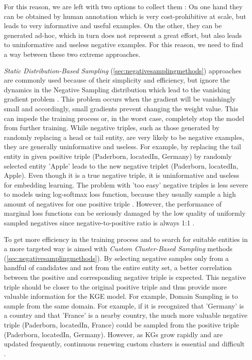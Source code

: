 For this reason, we are left with two options to collect them \cite{safavi2021negater}: 
On one hand they can be obtained by human annotation which is very cost-prohibitive at scale, but leads to very informative and useful examples. 
On the other, they can be generated ad-hoc, which in turn does not represent a great effort, but also leads to uninformative and useless negative examples.
For this reason, we need to find a way between these two extreme approaches.






\textit{Static Distribution-Based Sampling} (\autoref{sec:negativesamplingmethods}) approaches are commonly used because of their simplicity and efficiency, but ignore the dynamics in the Negative Sampling distribution which lead to the vanishing gradient problem \cite{qianunderstanding}.
This problem occurs when the gradient will be vanishingly small and accordingly, small gradients prevent changing the weight value.
This can impede the training process or, in the worst case, completely stop the model from further training.
While negative triples, such as those generated by randomly replacing a head or tail entity, are very likely to be negative examples, they are generally uninformative and useless.
For example, by replacing the tail entity in given positive triple (Paderborn, locatedIn, Germany) by randomly selected entity 'Apple' leads to the new negative triplet (Paderborn, locatedIn, Apple).
Even though it is a true negative triple, it is uninformative and useless for embedding learning.
The problem with 'too easy' negative triples is less severe to models using log-softmax loss function, because they usually sample a high amount of negatives for one positive triple \cite{cai2017kbgan}.
However, the performance of marginal loss functions can be seriously damaged by the low quality of uniformly sampled negatives since negative-to-positive ratio is always 1:1 \cite{cai2017kbgan}.


To get more efficiency in the training process and to search for suitable entities in a more targeted way is aimed with  \textit{Custom Cluster-Based Sampling} methods (\autoref{sec:negativesamplingmethods}).
By selecting negative samples only from a handful of candidates and not from the entire entity set, a better correlation between the positive and corresponding negative triple is expected.
This negative triple should be closer to the original positive triple and thus provide more valuable information for the \ac{KGE} model.
For example, Domain Sampling \cite{domainSampling} is to sample from the same domain.
For example, if it is recognized that 'Germany' is a country and that 'France' is a nearby country, the much more valuable negative triple (Paderborn, locatedIn, France) could be sampled from the  positive triple (Paderborn, locatedIn, Germany).
However, as \acp{KG} grow rapidly and are updated frequently, continuous renewing custom clusters is essential and difficult \cite{qianunderstanding}.

